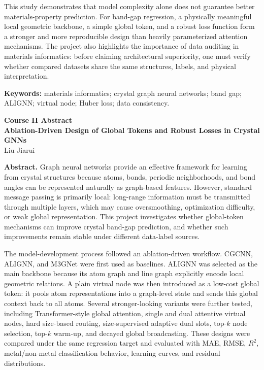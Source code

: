 \documentclass[11pt,a4paper]{article}
\begin{document}
This study demonstrates that model complexity alone does not guarantee better materials-property prediction. For band-gap regression, a physically meaningful local geometric backbone, a simple global token, and a robust loss function form a stronger and more reproducible design than heavily parameterized attention mechanisms. The project also highlights the importance of data auditing in materials informatics: before claiming architectural superiority, one must verify whether compared datasets share the same structures, labels, and physical interpretation.

\textbf{Keywords:} materials informatics; crystal graph neural networks; band gap; ALIGNN; virtual node; Huber loss; data consistency.

\newpage

\begin{center}
{\Large\bfseries Course II Abstract}\\[0.35em]
{\bfseries Ablation-Driven Design of Global Tokens and Robust Losses in Crystal GNNs}\\[0.25em]
Liu Jiarui
\end{center}

\textbf{Abstract.}
Graph neural networks provide an effective framework for learning from crystal structures because atoms, bonds, periodic neighborhoods, and bond angles can be represented naturally as graph-based features. However, standard message passing is primarily local: long-range information must be transmitted through multiple layers, which may cause oversmoothing, optimization difficulty, or weak global representation. This project investigates whether global-token mechanisms can improve crystal band-gap prediction, and whether such improvements remain stable under different data-label sources.

The model-development process followed an ablation-driven workflow. CGCNN, ALIGNN, and M3GNet were first used as baselines. ALIGNN was selected as the main backbone because its atom graph and line graph explicitly encode local geometric relations. A plain virtual node was then introduced as a low-cost global token: it pools atom representations into a graph-level state and sends this global context back to all atoms. Several stronger-looking variants were further tested, including Transformer-style global attention, single and dual attentive virtual nodes, hard size-based routing, size-supervised adaptive dual slots, top-\(k\) node selection, top-\(k\) warm-up, and decayed global broadcasting. These designs were compared under the same regression target and evaluated with MAE, RMSE, \(R^2\), metal/non-metal classification behavior, learning curves, and residual distributions.
\end{document}
